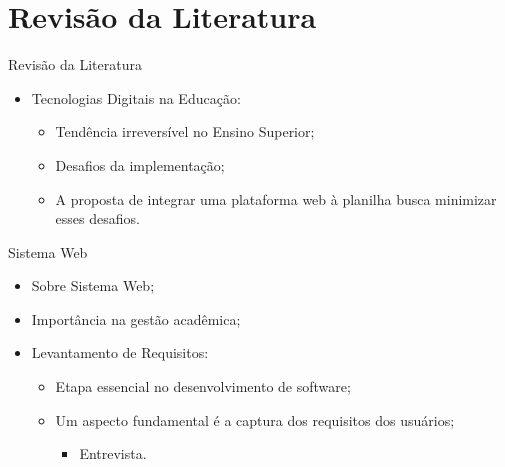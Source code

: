 \section{Revisão da Literatura}

\begin{frame}{Revisão da Literatura}
    \begin{itemize}
        \item Tecnologias Digitais na Educação: \vspace{0.5cm}
              \begin{itemize}
                  \item Tendência irreversível no Ensino Superior; \vspace{0.5cm}
                  \item Desafios da implementação; \vspace{0.5cm}
                  \item A proposta de integrar uma plataforma web à planilha busca minimizar esses desafios. \vspace{0.5cm}
              \end{itemize}
    \end{itemize}
\end{frame}

\begin{frame}{Sistema Web}
    \begin{itemize}
        \item Sobre Sistema Web; \vspace{0.5cm}
        \item Importância na gestão acadêmica; \vspace{0.5cm}
        \item Levantamento de Requisitos: \vspace{0.5cm}
        \begin{itemize}
            \item Etapa essencial no desenvolvimento de software; \vspace{0.5cm}
            \item Um aspecto fundamental é a captura dos requisitos dos usuários; \vspace{0.25cm}
            \begin{itemize}
                \item Entrevista. \vspace{0.25cm}
            \end{itemize}
        \end{itemize}
    \end{itemize}
\end{frame}

